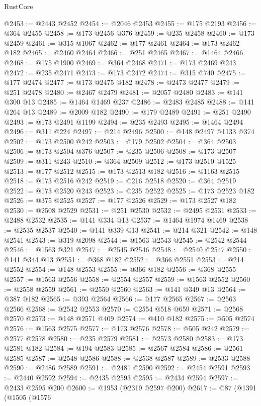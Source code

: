 \begin{lexlean}{RustCore}
\begin{coremodule}
@2453 := @2443 @2452
@2454 := @2046 @2453
@2455 := @175 @2193
@2456 := @364 @2455
@2458 := @173 @2456 @376
@2459 := @235 @2458
@2460 := @173 @2459
@2461 := @315 @1067
@2462 := @177 @2461
@2464 := @173 @2462 @182
@2465 := @2460 @2464
@2466 := @251 @2465
@2467 := @1464 @2466
@2468 := @175 @1900
@2469 := @364 @2468
@2471 := @173 @2469 @243
@2472 := @235 @2471
@2473 := @173 @2472
@2474 := @315 @740
@2475 := @177 @2474
@2477 := @173 @2475 @182
@2478 := @2473 @2477
@2479 := @251 @2478
@2480 := @2467 @2479
@2481 := @2057 @2480
@2483 := @141 @300 @13
@2485 := @1464 @1469 @237
@2486 := @2483 @2485
@2488 := @141 @264 @13
@2489 := @2009 @182
@2490 := @179 @2489
@2491 := @251 @2490
@2493 := @173 @2491 @1199
@2494 := @235 @2493
@2495 := @1464 @2494
@2496 := @311 @224
@2497 := @214 @2496
@2500 := @148 @2497 @1133 @374
@2502 := @173 @2500 @242
@2503 := @179 @2502
@2504 := @364 @2503
@2506 := @173 @2504 @376
@2507 := @235 @2506
@2508 := @173 @2507
@2509 := @311 @243
@2510 := @364 @2509
@2512 := @173 @2510 @1525
@2513 := @177 @2512
@2515 := @173 @2513 @182
@2516 := @1163 @2515
@2518 := @173 @2516 @242
@2519 := @216 @2518
@2520 := @364 @2519
@2522 := @173 @2520 @243
@2523 := @235 @2522
@2525 := @173 @2523 @182
@2526 := @375 @2525
@2527 := @177 @2526
@2529 := @173 @2527 @182
@2530 := @2508 @2529
@2531 := @251 @2530
@2532 := @2495 @2531
@2533 := @2488 @2532
@2535 := @141 @334 @13
@2537 := @1464 @1974 @1469
@2538 := @2535 @2537
@2540 := @141 @339 @13
@2541 := @214 @321
@2542 := @148 @2541
@2543 := @319 @2098
@2544 := @1563 @2543
@2545 := @2542 @2544
@2546 := @1563 @321
@2547 := @2545 @2546
@2548 := @2540 @2547
@2550 := @141 @344 @13
@2551 := @368 @182
@2552 := @366 @2551
@2553 := @214 @2552
@2554 := @148 @2553
@2555 := @366 @182
@2556 := @368 @2555
@2557 := @1563 @2556
@2558 := @2554 @2557
@2559 := @1563 @2552
@2560 := @2558 @2559
@2561 := @2550 @2560
@2563 := @141 @349 @13
@2564 := @387 @182
@2565 := @393 @2564
@2566 := @177 @2565
@2567 := @2563 @2566
@2568 := @2542 @2553
@2570 := @2554 @518 @659
@2571 := @2568 @2570
@2573 := @148 @2571 @409
@2574 := @410 @182
@2575 := @505 @2574
@2576 := @1563 @2575
@2577 := @173 @2576
@2578 := @505 @242
@2579 := @2577 @2578
@2580 := @235 @2579
@2581 := @2573 @2580
@2583 := @173 @2581 @182
@2584 := @194 @2583
@2585 := @2567 @2584
@2586 := @2561 @2585
@2587 := @2548 @2586
@2588 := @2538 @2587
@2589 := @2533 @2588
@2590 := @2486 @2589
@2591 := @2481 @2590
@2592 := @2454 @2591
@2593 := @2440 @2592
@2594 := @2435 @2593
@2595 := @2434 @2594
@2597 := @2433 @2595 @200
@2600 := @1953 (@2319 @2597 @200)
@2617 := @87
    (@1391
      (@1505
        (@1576

\end{coremodule}
\end{lexlean}
